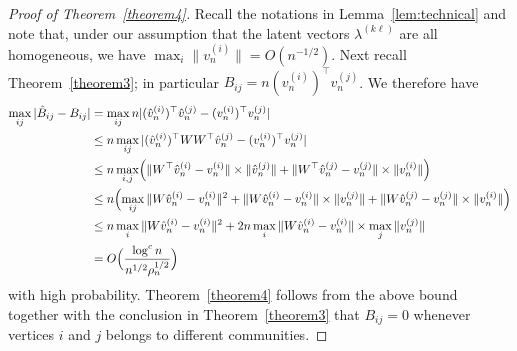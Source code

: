 \documentclass[12pt]{article}
\begin{document}
\begin{proof}[Proof of Theorem~\ref{theorem4}]
  Recall the notations in Lemma~\ref{lem:technical} and note that,
  under our assumption that the latent vectors $\lambda^{(k \ell)}$
  are all homogeneous, we have $\max_{i} \|v_n^{(i)}\| =
  O(n^{-1/2})$. 
Next recall Theorem~\ref{theorem3}; in particular $B_{ij} = n(v_n^{(i)})^{\top}
v_n^{(j)}$. %
We therefore have
\[\begin{split}
 \max_{ij} |\hat{B}_{ij} - B_{ij}| &= \max_{ij} n |(\hat{v}_n^{(i)})^\top \hat{v}_n^{(j)} -
(v_n^{(i)})^\top v_n^{(j)}| \\
& \leq n \max_{ij} |(\hat{v}_n^{(i)})^\top W W^\top \hat{v}_n^{(j)} -
(v_n^{(i)})^\top v_n^{(j)}| \\
& \leq n \max_{i,j} \Bigl(\|W^{\top} \hat{v}_n^{(i)} - v_n^{(i)}\| \times \|\hat{v}_n^{(j)}\|
+ \|W^{\top} \hat{v}_n^{(j)} - v_n^{(j)}\| \times \|v_n^{(i)}\|\Bigr) \\
& \leq n \Bigl(\max_{ij}  \|W \hat{v}_n^{(i)}  - v_n^{(i)} \|^2 +  \|W
\hat{v}_n^{(i)}  - v_n^{(i)} \| \times \|v_n^{(j)}\| +  \|W \hat{v}_n^{(j)}  - v_n^{(j)} \| \times \|v_n^{(i)}\|\Bigr) 
\\ &
\leq n \max_{i} \|W \hat{v}_n^{(i)}  - v_n^{(i)} \|^2 + 2n \max_{i}
\|W \hat{v}_n^{(i)}  - v_n^{(i)} \| \times \max_{j} \|v_n^{(j)}\|
\\
& = O \Big( \frac{\log^{c}{n}}{n^{1/2} \rho_n^{1/2}} \Big)
\end{split}\]
with high probability.
Theorem~\ref{theorem4} follows from the above bound together with the
conclusion in Theorem~\ref{theorem3} that $B_{ij} = 0$ whenever vertices $i$ and $j$
belongs to different communities. 
\end{proof}
\end{document}
